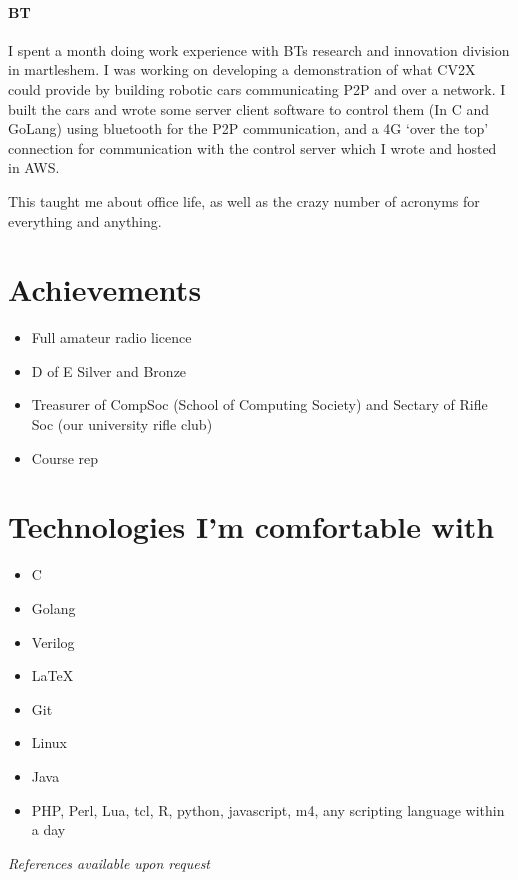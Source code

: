 \documentclass[9pt,a4paper]{article}
\begin{document}
\begin{multicols*}{2}
\paragraph{BT} I spent a month doing work experience with BTs research and innovation division in martleshem.
I was working on developing a demonstration of what CV2X could provide by building robotic cars communicating P2P and over a network.
I built the cars and wrote some server client software to control them (In C and GoLang) using bluetooth for the P2P communication, and a 4G `over the top' connection for communication with the control server which I wrote and hosted in AWS.

This taught me about office life, as well as the crazy number of acronyms for everything and anything.

\section*{Achievements}
\begin{itemize}
	\item Full amateur radio licence

	\item D of E Silver and Bronze

  \item Treasurer of CompSoc (School of Computing Society) and Sectary of Rifle Soc (our university rifle club)

	\item Course rep
\end{itemize}


\section*{Technologies I'm comfortable with}
\begin{multicols*}{2}
\begin{itemize}
\item C
\item Golang
\item Verilog
\item \LaTeX 
\item Git
\item Linux
\item Java
\item PHP, Perl, Lua, tcl, R, python, javascript, m4, any scripting language within a day
\end{itemize}
\end{multicols*}
\vfill
\textit{References available upon request}
\end{multicols*}
\end{document}
